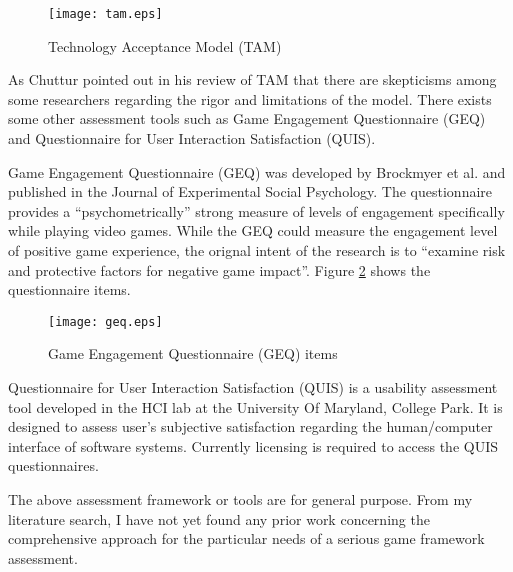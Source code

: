\begin{figure}[htbp]
	\centering
		\texttt{[image: tam.eps]}
		\caption{Technology Acceptance Model (TAM) \cite{davis1986technology}}
		\label{fig:tam}
\end{figure}

As Chuttur \cite{chuttur2009overview} pointed out in his review of TAM that there are skepticisms among some researchers regarding the rigor and limitations of the model. There exists some other assessment tools such as Game Engagement Questionnaire (GEQ) and Questionnaire for User Interaction Satisfaction (QUIS).  

Game Engagement Questionnaire (GEQ) \cite{brockmyer2009development} was developed by Brockmyer et al. and published in the Journal of Experimental Social Psychology. The questionnaire provides a ``psychometrically'' strong measure of levels of engagement specifically while playing video games. While the GEQ could measure the engagement level of positive game experience, the orignal intent of the research is to ``examine risk and protective factors for negative game impact''. Figure \ref{fig:geq} shows the questionnaire items.

\begin{figure}[htbp]
	\centering
		\texttt{[image: geq.eps]}
		\caption{Game Engagement Questionnaire (GEQ) items \cite{brockmyer2009development}}
		\label{fig:geq}
\end{figure}

Questionnaire for User Interaction Satisfaction (QUIS) \cite{harper1993improving} is a usability assessment tool developed in the HCI lab at the University Of Maryland, College Park. It is designed to assess user's subjective satisfaction regarding the human/computer interface of software systems. Currently licensing is required to access the QUIS questionnaires. 

The above assessment framework or tools are for general purpose. From my literature search, I have not yet found any prior work concerning the comprehensive approach for the particular needs of a serious game framework assessment. 